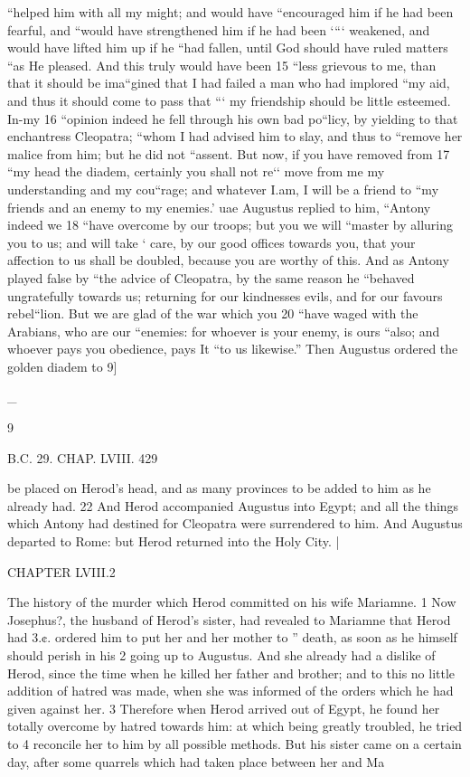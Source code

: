 “helped him with all my might; and would have “encouraged him if he had been fearful, and “would have strengthened him if he had been ‘“‘ weakened, and would have lifted him up if he “had fallen, until God should have ruled matters “as He pleased. And this truly would have been 15 “less grievous to me, than that it should be ima“gined that I had failed a man who had implored “my aid, and thus it should come to pass that “‘ my friendship should be little esteemed. In-my 16 “opinion indeed he fell through his own bad po“licy, by yielding to that enchantress Cleopatra; “whom I had advised him to slay, and thus to “remove her malice from him; but he did not “assent. But now, if you have removed from 17 “my head the diadem, certainly you shall not re‘‘ move from me my understanding and my cou“rage; and whatever I.am, I will be a friend to “my friends and an enemy to my enemies.’ uae Augustus replied to him, “Antony indeed we 18 “have overcome by our troops; but you we will “master by alluring you to us; and will take ‘ care, by our good offices towards you, that your affection to us shall be doubled, because you are worthy of this. And as Antony played false by “the advice of Cleopatra, by the same reason he “behaved ungratefully towards us; returning for our kindnesses evils, and for our favours rebel“lion. But we are glad of the war which you 20 “have waged with the Arabians, who are our “enemies: for whoever is your enemy, is ours “also; and whoever pays you obedience, pays It “to us likewise.” Then Augustus ordered the golden diadem to 9] 

_ 

9 

B.C. 29. CHAP. LVIII. 429 

be placed on Herod’s head, and as many provinces to be added to him as he already had. 
22 And Herod accompanied Augustus into Egypt; and all the things which Antony had destined for Cleopatra were surrendered to him. And Augustus departed to Rome: but Herod returned into the Holy City. | 

CHAPTER LVIII.2 

The history of the murder which Herod committed on his wife Mariamne. 
1 Now Josephus?, the husband of Herod’s sister, had revealed to Mariamne that Herod had 3.¢. ordered him to put her and her mother to ” death, as soon as he himself should perish in his 
2 going up to Augustus. And she already had a dislike of Herod, since the time when he killed her father and brother; and to this no little addition of hatred was made, when she was informed of the orders which he had given against her. 
3 Therefore when Herod arrived out of Egypt, he found her totally overcome by hatred towards him: at which being greatly troubled, he tried to 
4 reconcile her to him by all possible methods. But his sister came on a certain day, after some quarrels which had taken place between her and Ma

